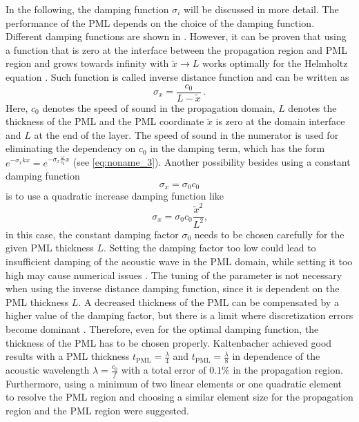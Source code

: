 In the following, the damping function $\sigma_i$ will be discussed in more detail. The performance of the PML depends on the choice of the damping function. Different damping functions are shown in \cite{kaltenbacher_numerical_2007}. However, it can be proven that using a function that is zero at the interface between the propagation region and PML region and grows towards infinity with $\tilde{x}\rightarrow L$ works optimally for the Helmholtz equation \cite{kaltenbacher_numerical_2007,KALTENBACHER_PML_2013}. Such function is called inverse distance function and can be written as
\begin{equation}
	\sigma_x = \frac{c_0}{L - \tilde{x}}\,. \label{eq:inverse_dis}
\end{equation}
Here, $c_0$ denotes the speed of sound in the propagation domain, $L$ denotes the thickness of the PML and the PML coordinate $\tilde{x}$ is zero at the domain interface and $L$ at the end of the layer. The speed of sound in the numerator is used for eliminating the dependency on $c_0$ in the damping term, which has the form $e^{-\sigma_x kx} = e^{-\sigma_x \frac{\omega}{c_0} x}$ (see \cref{eq:noname_3}). Another possibility besides using a constant damping function
\begin{equation}
	\sigma_x = \sigma_0c_0
\end{equation}
is to use a quadratic increase damping function like
\begin{equation}
	\sigma_x = \sigma_0c_0\frac{\tilde{x}^2}{L^2}\text{,}
\end{equation}
in this case, the constant damping factor $\sigma_0$ needs to be chosen carefully for the given PML thickness $L$. Setting the damping factor too low could lead to insufficient damping of the acoustic wave in the PML domain, while setting it too high may cause numerical issues \cite{KALTENBACHER_PML_2013}. The tuning of the parameter is not necessary when using the inverse distance damping function, since it is dependent on the PML thickness $L$. A decreased thickness of the PML can be compensated by a higher value of the damping factor, but there is a limit where discretization errors become dominant \cite{KALTENBACHER_PML_2013}. Therefore, even for the optimal damping function, the thickness of the PML has to be chosen properly. Kaltenbacher \cite{KALTENBACHER_PML_2013} achieved good results with a PML thickness $t_\text{PML} = \frac{\lambda}{4}$ and $t_\text{PML} = \frac{\lambda}{8}$ in dependence of the acoustic wavelength $\lambda = \frac{c_0}{f}$ with a total error of $0.1\%$ in the propagation region. Furthermore, using a minimum of two linear elements or one quadratic element to resolve the PML region and choosing a similar element size for the propagation region and the PML region were suggested.

